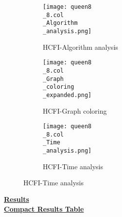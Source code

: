 \documentclass[10pt]{article}
\begin{document}
\graphicspath{{./Core1/Solutions/HCFI/queen8\_8.col}}
\begin{figure}[H]
\begin{subfigure}{.33\textwidth}
  \centering
  \texttt{[image: queen8\\\_8.col\\\_Algorithm\\\_analysis.png]}
  \caption{HCFI-Algorithm analysis}
   \label{fig:subfig1}
\end{subfigure}%
\begin{subfigure}{.33\textwidth}
  \centering
  \texttt{[image: queen8\\\_8.col\\\_Graph\\\_coloring\\\_expanded.png]}
  \caption{HCFI-Graph coloring}
  \label{fig:subfig2}
\end{subfigure}
\begin{subfigure}{.33\textwidth}
  \centering
  \texttt{[image: queen8\\\_8.col\\\_Time\\\_analysis.png]}
  \caption{HCFI-Time analysis}
  \end{subfigure}
\end{figure}
\vspace{2cm}
\begin{center}
\hyperlink{page.8}{\textbf{Results}}\\
\vspace{0.5cm}
\hyperlink{page.71}{\textbf{Compact Results Table}}
\end{center}
\pagebreak
\end{document}
